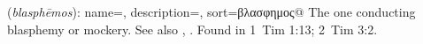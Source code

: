 \item[Blasphemous,]

(\textit{blasphēmos}):
{
    name=,
    description={},
    sort=βλασφημος@
}
The one conducting blasphemy or mockery. See also , .
Found in 1~Tim 1:13; 2~Tim 3:2.
